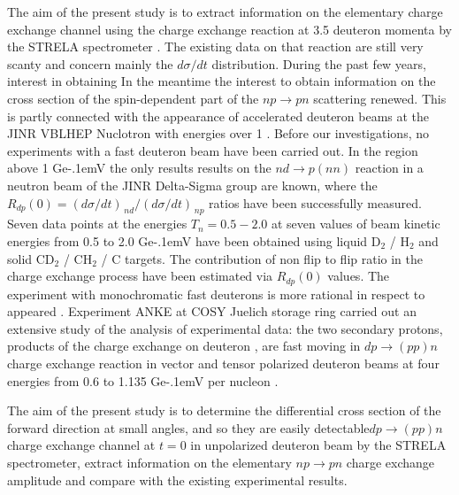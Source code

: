 \documentclass[twocolumn,epjc3]{svjour3}
\newcommand{\np}     {\ensuremath{np \rightarrow pn}\xspace}
\newcommand{\dpchex} {\ensuremath{dp \rightarrow (pp)n}\xspace}
\newcommand{\GeVc}   {Ge\kern-.1emV/c\xspace}
\newcommand{\GeV}    {Ge\kern-.1emV\xspace}
\providecommand{\DIFaddtex}[1]{{\protect\color{Green} \sf #1}} %
\providecommand{\DIFdeltex}[1]{{\protect\color{Red} \scriptsize #1}} %
\providecommand{\DIFaddbegin}{} %
\providecommand{\DIFaddend}{} %
\providecommand{\DIFdelbegin}{} %
\providecommand{\DIFdelend}{} %
\providecommand{\DIFadd}[1]{\texorpdfstring{\DIFaddtex{#1}}{#1}} %
\providecommand{\DIFdel}[1]{\texorpdfstring{\DIFdeltex{#1}}{}} %
\newcommand{\DIFscaledelfig}{0.5}
\newlength{\DIFdelgraphicswidth} %
\newlength{\DIFdelgraphicsheight} %
\newcommand{\DIFaddincludegraphics}[2][]{{\color{blue}\fbox{\DIFOincludegraphics[#1]{#2}}}} %
\newcommand{\DIFdelincludegraphics}[2][]{%
\sbox{\DIFdelgraphicsbox}{\DIFOincludegraphics[#1]{#2}}%
\settoboxwidth{\DIFdelgraphicswidth}{\DIFdelgraphicsbox} %
\settoboxtotalheight{\DIFdelgraphicsheight}{\DIFdelgraphicsbox} %
\scalebox{\DIFscaledelfig}{%
\parbox[b]{\DIFdelgraphicswidth}{\usebox{\DIFdelgraphicsbox}\\[-\baselineskip] \rule{\DIFdelgraphicswidth}{0em}}\llap{\resizebox{\DIFdelgraphicswidth}{\DIFdelgraphicsheight}{%
\setlength{\unitlength}{\DIFdelgraphicswidth}%
\begin{picture}(1,1)%
\thicklines\linethickness{2pt} %
{\color[rgb]{1,0,0}\put(0,0){\framebox(1,1){}}}%
{\color[rgb]{1,0,0}\put(0,0){\line( 1,1){1}}}%
{\color[rgb]{1,0,0}\put(0,1){\line(1,-1){1}}}%
\end{picture}%
}\hspace*{3pt}}} %
} %
\DeclareRobustCommand{\DIFaddbegin}{\DIFOaddbegin \let\includegraphics\DIFaddincludegraphics} %
\DeclareRobustCommand{\DIFaddend}{\DIFOaddend \let\includegraphics\DIFOincludegraphics} %
\DeclareRobustCommand{\DIFdelbegin}{\DIFOdelbegin \let\includegraphics\DIFdelincludegraphics} %
\DeclareRobustCommand{\DIFdelend}{\DIFOaddend \let\includegraphics\DIFOincludegraphics} %
\begin{document}
\DIFdelbegin \DIFdel{The aim of the present study is to extract information on the elementary }%
\DIFdel{charge exchange channel using the }%
\DIFdel{charge exchange reaction at 3.5 }%
\DIFdel{deuteron momenta by the STRELA spectrometer \cite{gla13}.
The existing data on
that reaction are still very scanty and concern mainly the $d\sigma/dt$
distribution. During the past few years, interest in obtaining }\DIFdelend \DIFaddbegin \DIFadd{In the meantime the interest to obtain }\DIFaddend information on the cross section of the
spin-dependent part of the \np scattering renewed. \DIFdelbegin \DIFdel{This
is partly connected with the appearance of accelerated deuteron beams at the
JINR VBLHEP Nuclotron with energies over 1 }%
\DIFdel{. Before our investigations, no
experiments with a fast deuteron beam have been carried out. }\DIFdelend In the region above 1 \GeV
\DIFdelbegin \DIFdel{the only results }\DIFdelend \DIFaddbegin \DIFadd{results on the $nd \rightarrow p(nn)$ reaction }\DIFaddend in a neutron beam of the \DIFaddbegin \DIFadd{JINR
}\DIFaddend Delta-Sigma group \DIFdelbegin \DIFdel{\cite{sha09,sha09_2,shi11} are known, where the
$R_{dp}(0) = (d\sigma/dt)_{\,nd} / (d\sigma/dt)_{\,np}$ ratios have been
successfully measured. Seven data points at the energies $T_n = 0.5 - 2.0$ }\DIFdelend \DIFaddbegin \DIFadd{at seven values of beam kinetic energies from 0.5 to 2.0 }\DIFaddend \GeV
\DIFdelbegin \DIFdel{have been obtained using liquid D$_2$ / H$_2$ and solid CD$_2$ / CH$_2$ / C
targets. The contribution of non flip to flip ratio in the }%
\DIFdel{charge exchange process have been estimated via $R_{dp}(0)$ values.
The experiment with
monochromatic fast deuterons is more rational in respect to }\DIFdelend \DIFaddbegin \DIFadd{appeared \cite{sha09,sha09_2,shi11}. Experiment ANKE at COSY Juelich storage
ring carried out an extensive study of }\DIFaddend the \DIFdelbegin \DIFdel{analysis of
experimental data: the two secondary protons, products of the charge exchange on
deuteron }%
\DIFdel{, are fast moving in }\DIFdelend \DIFaddbegin \dpchex \DIFadd{charge exchange reaction in
vector and tensor polarized deuteron beams at four energies from 0.6 to 1.135
}\GeV \DIFadd{per nucleon \cite{chi09,mch13}.
}

\DIFadd{The aim of the present study is to determine the differential cross section of
}\DIFaddend the \DIFdelbegin \DIFdel{forward direction at small angles, and
so they are easily detectable}\DIFdelend \DIFaddbegin \dpchex \DIFadd{charge exchange channel at $t = 0$ in unpolarized deuteron beam by
the STRELA spectrometer, extract information on the elementary }\np \DIFadd{charge
exchange amplitude and compare with the existing experimental results}\DIFaddend .
\end{document}
